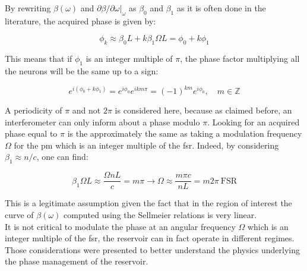 By rewriting $\beta(\omega)$ and $\partial\beta/\partial\omega\rvert_\omega$ as $\beta_0$ and $\beta_1$ as it is often done in the literature, the acquired phase is given by:

\begin{equation}
	\phi_k \approx \beta_0 L + k \beta_1 \Omega L = \phi_0 + k \phi_1
\end{equation}

This means that if $\phi_1$ is an integer multiple of $\pi$, the phase factor multiplying all the neurons will be the same up to a sign:

\begin{equation}
	e^{i(\phi_0+k\phi_1)} = e^{i\phi_0}e^{ikm\pi} =(-1)^{km} e^{i\phi_0}, \quad m \in \mathbb{Z}
\end{equation}

A periodicity of $\pi$ and not $2\pi$ is considered here, because as claimed before, an interferometer can only inform about a phase modulo $\pi$. Looking for an acquired phase equal to $\pi$ is the approximately the same as taking a modulation frequency $\Omega$ for the \gls{pm} which is an integer multiple of the \gls{fsr}. Indeed, by considering $\beta_1 \approx n/c$, one can find:

\begin{equation}
	\beta_1 \Omega L \approx \frac{\Omega n L}{c} = m\pi \longrightarrow \Omega \approx \frac{m\pi c}{n L} = m2\pi ~\text{FSR}
\end{equation}

This is a legitimate assumption given the fact that in the region of interest the curve of $\beta(\omega)$ computed using the Sellmeier relations \cite{Bruckner,malitson1965interspecimen} is very linear.\\

It is not critical to modulate the phase at an angular frequency $\Omega$ which is an integer multiple of the \gls{fsr}, the reservoir can in fact operate in different regimes. Those considerations were presented to better understand the physics underlying the phase management of the reservoir.\\

